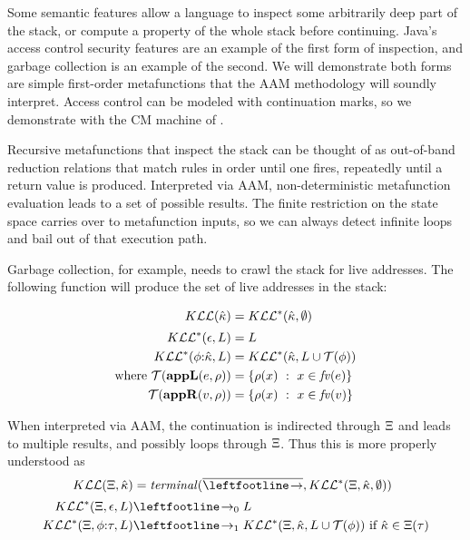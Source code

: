 Some semantic features allow a language to inspect some arbitrarily deep part of the stack, or compute a property of the whole stack before continuing.
%
Java's access control security features are an example of the first form of inspection, and garbage collection is an example of the second.
%
We will demonstrate both forms are simple first-order metafunctions that the AAM methodology will soundly interpret.
%
Access control can be modeled with continuation marks, so we demonstrate with the CM machine of \citeauthor{dvanhorn:Clements2004Tailrecursive}.

Recursive metafunctions that inspect the stack can be thought of as out-of-band reduction relations that match rules in order until one fires, repeatedly until a return value is produced.
%
Interpreted via AAM, non-deterministic metafunction evaluation leads to a set of possible results.
%
The finite restriction on the state space carries over to metafunction inputs, so we can always detect infinite loops and bail out of that execution path.

Garbage collection, for example, needs to crawl the stack for live addresses.
%
The following function will produce the set of live addresses in the stack:

\begin{align*}
  K{\mathcal L}{\mathcal L}(\hat{\kappa}) &= K{\mathcal L}{\mathcal L}^*(\hat{\kappa},\emptyset) \\[2pt]
  K{\mathcal L}{\mathcal L}^*(\epsilon,L) &= L \\
  K{\mathcal L}{\mathcal L}^*(\phi{\tt :} \hat{\kappa}, L) &= K{\mathcal L}{\mathcal L}^*(\hat{\kappa}, L\cup{\mathcal T}(\phi)) \\
  \text{where } {\mathcal T}(\mathbf{appL}(e,\rho)) &= \{ \rho(x)\ :\ x \in \mathit{fv}(e)\} \\
                {\mathcal T}(\mathbf{appR}(v,\rho)) &= \{ \rho(x)\ :\ x \in \mathit{fv}(v)\}
\end{align*}

When interpreted via AAM, the continuation is indirected through $\Xi$ and leads to multiple results, and possibly loops through $\Xi$.
%
Thus this is more properly understood as
\begin{align*}
  \kontlive(\mktab,\makont) &= \terminal(\overline{\stepto},\kontliveaux(\mktab,\makont,\emptyset)) \\[2pt]
  \kontliveaux(\mktab,\epsilon,L) &\stepto_0 L \\
  \kontliveaux(\mktab,\kcons{\mkframe}{\mctx}, L) &\stepto_1 \kontliveaux(\mktab,\makont, L\cup\touches(\mkframe)) \text{ if } \makont \in \mktab(\mctx)
\end{align*}


